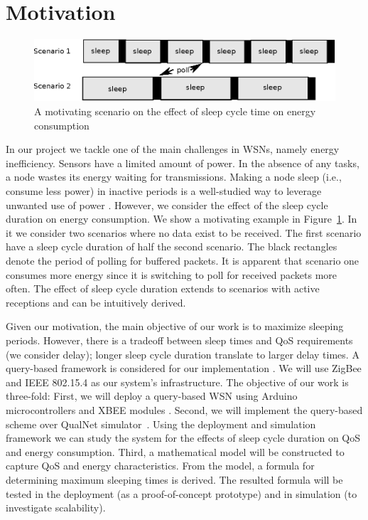 \section{Motivation} \label{sec:motivation}


\begin{figure}[t]
\centering
\includegraphics[scale=0.65]{figures/drawing.eps}
\caption{A motivating scenario on the effect of sleep cycle time on energy consumption}
\label{fig:motivating}
\end{figure}

In our project we tackle one of the main challenges in WSNs, namely energy inefficiency. Sensors have a limited amount of power. In the absence of any tasks, a node wastes its energy waiting for transmissions. Making a node sleep (i.e., consume less power) in inactive periods is a well-studied way to leverage unwanted use of power \cite{1}. However, we consider the effect of the sleep cycle duration on energy consumption. We show a motivating example in Figure~\ref{fig:motivating}. In it we consider two scenarios where no data exist to be received. The first scenario have a sleep cycle duration of half the second scenario. The black rectangles denote the period of polling for buffered packets. It is apparent that scenario one consumes more energy since it is switching to poll for received packets more often. The effect of sleep cycle duration extends to scenarios with active receptions and can be intuitively derived.  

Given our motivation, the main objective of our work is to maximize sleeping periods. However, there is a tradeoff between sleep times and QoS requirements (we consider delay); longer sleep cycle duration translate to larger delay times. A query-based framework is considered for our implementation \cite{2}. We will use ZigBee and IEEE 802.15.4 \cite{3} as our system's infrastructure. The objective of our work is three-fold: First, we will deploy a query-based WSN using Arduino microcontrollers \cite{17} and XBEE modules \cite{18}. Second, we will implement the query-based scheme over QualNet simulator~\cite{16}. Using the deployment and simulation framework we can study the system for the effects of sleep cycle duration on QoS and energy consumption. Third, a mathematical model will be constructed to capture QoS and energy characteristics. From the model, a formula for determining maximum sleeping times is derived. The resulted formula will be tested in the deployment (as a proof-of-concept prototype) and in simulation (to investigate scalability).

